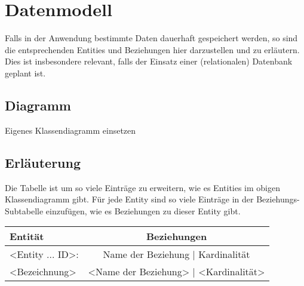 \chapter{Datenmodell}
Falls in der Anwendung bestimmte Daten dauerhaft gespeichert werden, so sind
die entsprechenden Entities und Beziehungen hier darzustellen und zu erl\"autern.
Dies ist insbesondere relevant, falls der Einsatz einer (relationalen)
Datenbank geplant ist.

\section{Diagramm}

Eigenes Klassendiagramm einsetzen
\section{Erl\"auterung}
Die Tabelle ist um so viele Eintr\"age zu erweitern, wie es Entities im obigen
Klassendiagramm gibt. F\"ur jede Entity sind so viele Eintr\"age in der
Beziehungs-Subtabelle einzuf\"ugen, wie es Beziehungen zu dieser Entity gibt.


\begin{tabular}[ht]{|l|c|}
  \hline
  Entit\"at & Beziehungen\\
  \hline\hline
  <Entity ... ID>:  & Name der Beziehung |  Kardinalit\"at\\
  \hline\hline\hline
  <Bezeichnung> & <Name der Beziehung> | <Kardinalit\"at>\\
  \hline
\end{tabular}
